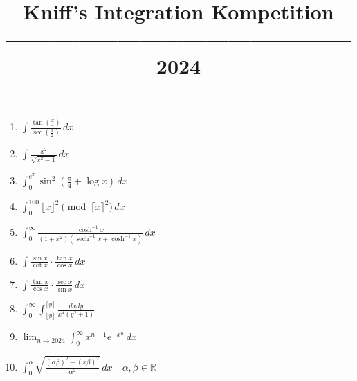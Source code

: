 \documentclass[12pt]{article}
\title{\vspace{-2cm}\large \raggedright Kniff's Integration Kompetition ----------------------------------------------- 2024}
\date{\vspace{-2cm}} %
\DeclareMathOperator{\sech}{sech}
\begin{document}
\maketitle
\pagestyle{plain}
\setlength{\parskip}{1em}
\setlength{\parindent}{0em}

\begin{enumerate}
    \item {\Large \( \displaystyle \int \frac{\tan(\frac{x}{4})}{\sec(\frac{x}{2})} \, dx \)}
    \vspace{.5cm}
    \item {\Large \( \displaystyle \int \frac{x^{2}}{\sqrt{x^2-1}} \, dx \)}
    \vspace{.5cm}
    \item {\Large \( \displaystyle \int_0^{e^{\pi}} \sin^2({\frac{\pi}{4}+\log{x}}) \, dx \)}
    \vspace{.5cm}
    \item {\Large \( \displaystyle \int_0^{100} \lfloor x \rfloor^2\pmod {\lceil x \rceil^2} \, dx \)}
    \vspace{.5cm}
    \item {\Large \( \displaystyle \int_0^{\infty} \frac{\cosh^{-1} x}{(1+x^2)(\sech^{-1} x + \cosh^{-1} x)} \, dx \)}
    \vspace{.5cm}
    \item {\Large \( \displaystyle \int \frac{\sin x}{\cot x} \cdot \frac{\tan x}{\cos x}  \, dx \)}
    \vspace{.5cm}
    \item {\Large \( \displaystyle \int \frac{\tan x}{\cos x} \cdot \frac{\sec x}{\sin x}  \, dx \)}
    \vspace{.5cm}
    \item {\Large \( \displaystyle \int_0^{\infty} \int_{\lfloor y \rfloor}^{\lceil y \rceil} \frac{dx dy}{x^4(y^2 + 1)} \)}
    \vspace{.5cm}
    \item {\Large \( \displaystyle \lim_{n\to{2024}} \int_0^\infty x^{n-1}e^{-x^n}\, dx \)}
    \vspace{.5cm}
    \item {\Large \( \displaystyle \int_0^{\alpha} \sqrt{\frac{(\alpha\beta)^2-(x\beta)^2}{\alpha^2}} \, dx \quad \alpha,\beta \in\mathbb{R} \)}
\end{enumerate}

\newpage
\end{document}
